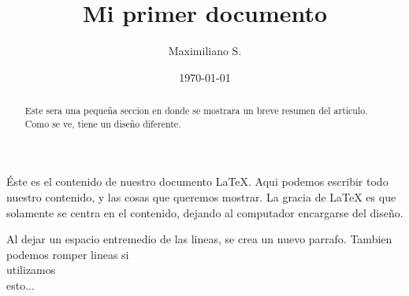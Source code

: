 \documentclass[12pt]{article}
\title{Mi primer documento}
\author{Maximiliano S.}
\date{\today}
\begin{document}
    \begin{titlepage}
        \maketitle
    \end{titlepage}

    \begin{abstract}
        Este sera una pequeña seccion en donde se mostrara un breve resumen del
        articulo. Como se ve, tiene un diseño diferente.
    \end{abstract}

    Éste es el contenido de nuestro documento \LaTeX. Aqui podemos escribir
    todo nuestro contenido, y las cosas que queremos mostrar. La gracia de \LaTeX
    es que solamente se centra en el contenido, dejando al computador encargarse
    del diseño.

    Al dejar un espacio entremedio de las lineas, se crea un nuevo parrafo.
    Tambien podemos romper lineas si \\ utilizamos \\ esto...
\end{document}

